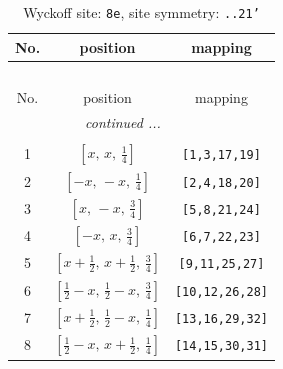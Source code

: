 \documentclass[fleqn,8pt]{jsarticle}
\begin{document}
\renewcommand{\arraystretch}{1.2}
\begin{longtable}{ccc}
\caption{Wyckoff site: {\tt 8e}, site symmetry: {\tt ..21'}}
 \\
 \hline \hline
No. & position & mapping \\ \hline \endfirsthead

\multicolumn{2}{l}{\tablename\ \thetable{}} \\
 \hline \hline
No. & position & mapping \\ \hline \endhead

 \hline \hline
\multicolumn{2}{r}{\footnotesize\it continued ...} \\ \endfoot

 \hline \hline
\multicolumn{2}{r}{} \\ \endlastfoot

1 & $\left[ x,\, x,\, \frac{1}{4} \right]$ & {\tt [1,3,17,19]} \\ \hline
2 & $\left[ - x,\, - x,\, \frac{1}{4} \right]$ & {\tt [2,4,18,20]} \\ \hline
3 & $\left[ x,\, - x,\, \frac{3}{4} \right]$ & {\tt [5,8,21,24]} \\ \hline
4 & $\left[ - x,\, x,\, \frac{3}{4} \right]$ & {\tt [6,7,22,23]} \\ \hline
5 & $\left[ x + \frac{1}{2},\, x + \frac{1}{2},\, \frac{3}{4} \right]$ & {\tt [9,11,25,27]} \\ \hline
6 & $\left[ \frac{1}{2} - x,\, \frac{1}{2} - x,\, \frac{3}{4} \right]$ & {\tt [10,12,26,28]} \\ \hline
7 & $\left[ x + \frac{1}{2},\, \frac{1}{2} - x,\, \frac{1}{4} \right]$ & {\tt [13,16,29,32]} \\ \hline
8 & $\left[ \frac{1}{2} - x,\, x + \frac{1}{2},\, \frac{1}{4} \right]$ & {\tt [14,15,30,31]} \\
\end{longtable}
\renewcommand{\arraystretch}{1.2}
\end{document}
